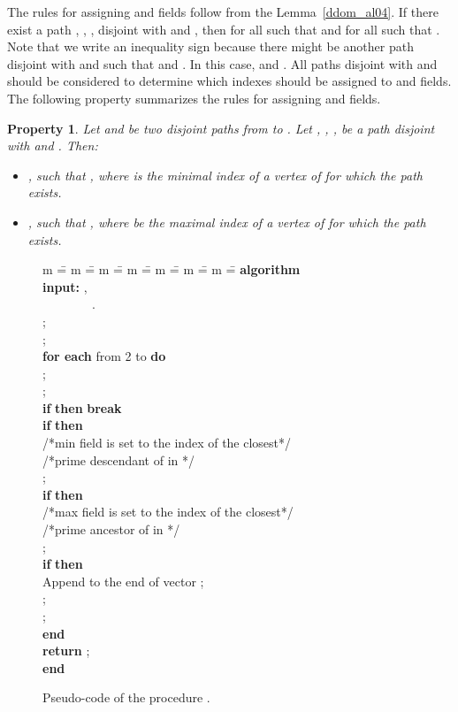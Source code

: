 \documentclass{llncs}
\newtheorem{prop}{Property}
\newcommand{\ALGORITHM}{\textbf{algorithm} }
\newcommand{\END}{\textbf{end} }
\newcommand{\DO}{\textbf{do} }
\newcommand{\FOREACH}{\textbf{for each} }
\newcommand{\IF}{\textbf{if} }
\newcommand{\RETURN}{\textbf{return} }
\newcommand{\THEN}{\textbf{then} }
\newcommand{\BREAK}{\textbf{break} }
\newcommand{\INPUT}{\textbf{input:} }
\begin{document}
The rules for assigning  and  fields follow from the Lemma~\ref{ddom_al04}. 
If there exist a  path , , , disjoint with  and ,
then  for all  such that 
and  for all  such that .
Note that we write an inequality sign because there might be another path
 disjoint with  and  such that  and .
In this case,  and . 
All paths disjoint with  and  should be considered to determine which indexes should be assigned to 
 and  fields. The following property summarizes the rules for assigning  and  fields.

\begin{prop} \label{ddom_minmax}
Let  and  be two disjoint paths from  to . 
Let , , , be a path
disjoint with  and . Then:
\begin{itemize}
\item[(a)]
,  such that , 
where  is the minimal index of a vertex of  for which 
the path  exists.
\item[(b)]
,  such that , 
where  be the maximal index of a vertex of  for which 
the path  exists.
\end{itemize}
\end{prop}

\begin{figure}[t!]
\begin{center}
\parbox{0cm} 
{
\begin{tabbing}
m \== m \== m \== m \== m \== m \== m \== \kill
\ALGORITHM  \\
\INPUT ,\\
~~~~~~~~.\\
\> ;\\
\> ;\\
\> \FOREACH  from 2  to  \DO \\
\> \> ;\\
\> \> ;\\
\> \> \IF  \THEN \BREAK \\
\> \> \IF  \THEN \\
\> \> \> /*min field is set to the index of the closest*/ \\
\> \> \> /*prime descendant of  in  */ \\
\> \> \>  ;\\
\> \> \IF  \THEN \\
\> \> \> /*max field is set to the index of the closest*/ \\
\> \> \> /*prime ancestor of  in */ \\
\> \> \>  ;\\
\> \> \IF  \THEN \\
\> \> \> Append  to the end of vector ;\\
\> \> \> ;\\
\> \> \> ;\\
\> \END \\
\> \RETURN ;\\
\END
\end{tabbing}
}
\caption{Pseudo-code of the procedure .}\label{ddom_code3a}
\end{center}
\end{figure}
\end{document}
